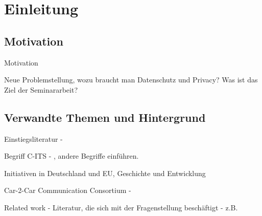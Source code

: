 
\section{Einleitung}
\label{ch:Introduction}



\subsection{Motivation}
Motivation

Neue Problemstellung, wozu braucht man Datenschutz und Privacy? Was ist das Ziel der Seminararbeit?


\subsection{Verwandte Themen und Hintergrund}
\label{sec:Introduction:Citation}

Einstiegsliteratur - 
\cite{Strubbe2017}
\cite{Kiometzis2017}

Begriff C-ITS - \cite{CITS2016}, andere Begriffe einführen.

Initiativen in Deutschland und EU, Geschichte und Entwicklung

Car-2-Car Communication Consortium - \cite{Car2Car}

Related work - Literatur, die sich mit der Fragenstellung beschäftigt - z.B. \cite{Jochum2020}


%

